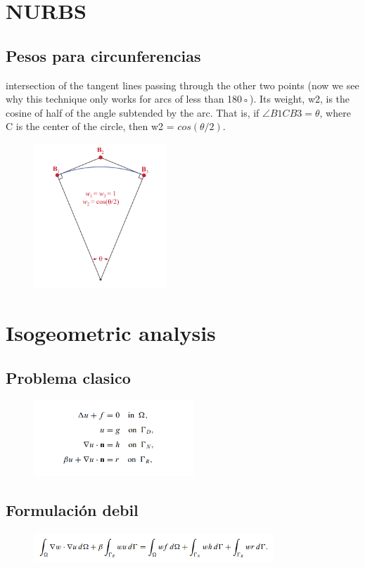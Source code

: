 \documentclass[12pt]{article}
\begin{document}
\section{NURBS}

\subsection{Pesos para circunferencias}

intersection of the tangent lines passing through the other two points (now we see why this
technique only works for arcs of less than 180◦). Its weight, w2, is the cosine of half of the
angle subtended by the arc. That is, if $\angle B1CB3 = \theta$, where C is the center of the circle, then
w2 =  $cos(\theta /2) $.

\begin{figure}[h]
\includegraphics[width=5cm]{angulo.png}
\centering
\end{figure}

\section{Isogeometric analysis}

\subsection{Problema clasico}
\begin{figure}[h]
\includegraphics[width=6cm]{problema_clasico.png}
\centering
\end{figure}
\subsection{Formulación debil}
\begin{figure}[h]
\includegraphics[width=9cm]{formulacion_debil.png}
\centering
\end{figure}
\end{document}
